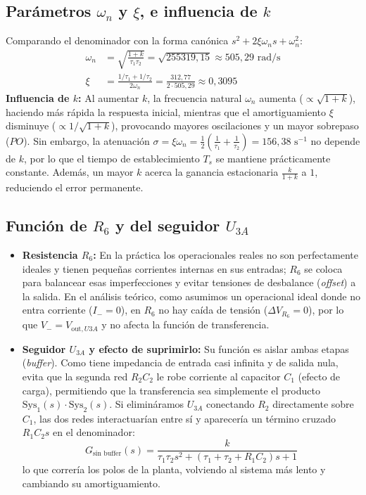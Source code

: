 \documentclass[11pt,a4paper]{article}
\begin{document}
\subsection{Parámetros $\omega_n$ y $\xi$, e influencia de $k$}
Comparando el denominador con la forma canónica $s^2 + 2\xi\omega_n s + \omega_n^2$:
\begin{align}
    \omega_n &= \sqrt{\frac{1+k}{\tau_1 \tau_2}} = \sqrt{255319,15} \approx 505,29\text{ rad/s} \\
    \xi &= \frac{1/\tau_1 + 1/\tau_2}{2\omega_n} = \frac{312,77}{2 \cdot 505,29} \approx 0,3095
\end{align}
\textbf{Influencia de $k$:} Al aumentar $k$, la frecuencia natural $\omega_n$ aumenta ($\propto \sqrt{1+k}$), haciendo más rápida la respuesta inicial, mientras que el amortiguamiento $\xi$ disminuye ($\propto 1/\sqrt{1+k}$), provocando mayores oscilaciones y un mayor sobrepaso ($PO$). Sin embargo, la atenuación $\sigma = \xi\omega_n = \frac{1}{2}\left(\frac{1}{\tau_1} + \frac{1}{\tau_2}\right) = 156,38\text{ s}^{-1}$ no depende de $k$, por lo que el tiempo de establecimiento $T_s$ se mantiene prácticamente constante. Además, un mayor $k$ acerca la ganancia estacionaria $\frac{k}{1+k}$ a $1$, reduciendo el error permanente.

\subsection{Función de $R_6$ y del seguidor $U_{3A}$}
\begin{itemize}
    \item \textbf{Resistencia $R_6$:} En la práctica los operacionales reales no son perfectamente ideales y tienen pequeñas corrientes internas en sus entradas; $R_6$ se coloca para balancear esas imperfecciones y evitar tensiones de desbalance (\textit{offset}) a la salida. En el análisis teórico, como asumimos un operacional ideal donde no entra corriente ($I_- = 0$), en $R_6$ no hay caída de tensión ($\Delta V_{R_6} = 0$), por lo que $V_- = V_{\text{out},U3A}$ y no afecta la función de transferencia.
    \item \textbf{Seguidor $U_{3A}$ y efecto de suprimirlo:} Su función es aislar ambas etapas (\textit{buffer}). Como tiene impedancia de entrada casi infinita y de salida nula, evita que la segunda red $R_2 C_2$ le robe corriente al capacitor $C_1$ (efecto de carga), permitiendo que la transferencia sea simplemente el producto $\text{Sys}_1(s) \cdot \text{Sys}_2(s)$. Si elimináramos $U_{3A}$ conectando $R_2$ directamente sobre $C_1$, las dos redes interactuarían entre sí y aparecería un término cruzado $R_1 C_2 s$ en el denominador:
    \begin{equation}
        G_{\text{sin buffer}}(s) = \frac{k}{\tau_1 \tau_2 s^2 + (\tau_1 + \tau_2 + R_1 C_2)s + 1}
    \end{equation}
    lo que correría los polos de la planta, volviendo al sistema más lento y cambiando su amortiguamiento.
\end{itemize}
\end{document}
